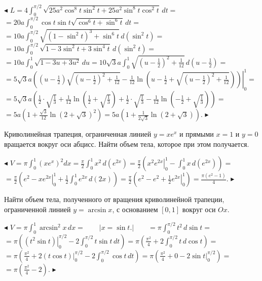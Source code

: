 \documentclass[a5paper,10pt]{article}
\begin{document}
\medskip
\noindent $\blacktriangleleft$
$\displaystyle L=4\int_0^{\pi/2}\sqrt{25a^2\cos^8t\sin^2t+25a^2\sin^8t\cos^2t}\,dt=$\\
$\displaystyle =20a\int_0^{\pi/2}\cos t\sin t\sqrt{\cos^6t+\sin^6t}\,dt=$\\
$\displaystyle =10a\int_0^{\pi/2}\sqrt{(1-\sin^2t)^3+\sin^6t}\,d(\sin^2 t)=$\\
$\displaystyle =10a\int_0^{\pi/2}\sqrt{1-3\sin^2t+3\sin^4t}\,d(\sin^2 t)=$\\
$\displaystyle =10a\int_0^1\sqrt{1-3u+3u^2}\,du=10\sqrt3a\int_0^1
\sqrt{\left(u-\frac12\right)^2+\frac{1}{12}}\,d\left(u-\frac12\right)=$\\
$\displaystyle =5\sqrt3a\left.\left(\left(u-\frac12\right)
\sqrt{\left(u-\frac12\right)^2+\frac{1}{12}}-
\frac{1}{12}\ln\left(u-\frac12+
\sqrt{\left(u-\frac12\right)^2+
\frac{1}{12}}\right)\right)\right|_0^1=$\\
$\displaystyle =5\sqrt3a\left(\frac12\cdot\sqrt{\frac13}+
\frac{1}{12}\ln\left(\frac12+\sqrt{\frac13}\right)+
\frac12\cdot\sqrt{\frac13}-
\frac{1}{12}\ln\left(-\frac12+\sqrt{\frac13}\right)\right)=$\\
$\displaystyle =5a\left(1+\frac{\sqrt3}{12}\ln(2+\sqrt3)^2\right)=
5a\left(1+\frac{1}{2\sqrt3}\ln(2+\sqrt3)\right)$.
$\blacktriangleright$

\medskip
{} Криволинейная трапеция, ограниченная линией $y=xe^x$
и прямыми $x=1$ и $y=0$ вращается вокруг оси абцисс. Найти объем тела,
которое при этом получается.

\medskip
\noindent $\blacktriangleleft$ $\displaystyle V=\pi\int_0^1(xe^x)^2dx=
\frac{\pi}{2}\int_0^1x^2\,d(e^{2x})=
\frac{\pi}{2}\left(\left.x^2e^{2x}\right|_0^1-
\int_0^1x\,d(e^{2x})\right)=$\\
$\displaystyle =\frac{\pi}{2}\left(e^2-\left.xe^{2x}\right|_0^1
+\frac12\int_0^1e^{2x}\,d(2x)\right)=
\frac{\pi}{2}\left(e^2-e^2+\frac12\left.e^{2x}\right|_0^1\right)=
\frac{\pi(e^2-1)}{4}$. $\blacktriangleright$

\medskip
{} Найти объем тела, полученного от вращения
криволинейной трапеции, ограниченной линией $y=\arcsin x$,
с основанием $[0,1]$ вокруг оси $Ox$.

\medskip
\noindent $\blacktriangleleft$ $\displaystyle V=\pi\int_0^1\arcsin^2x\,dx=
\qquad\left|x=\sin t.\right|\qquad
=\pi\int_0^{\pi/2}t^2\,d\sin t=$\\
$\displaystyle =\pi\left(\left.(t^2\sin t)\right|_0^{\pi/2}-2\int_0^{\pi/2}t\sin t\,dt\right)=
\pi\left(\frac{\pi^2}{4}+2\int_0^{\pi/2}t\,d\cos t\right)=$\\
$\displaystyle =\pi\left(\frac{\pi^2}{4}+2\left.(t\cos t)\right|_0^{\pi/2}-
2\int_0^{\pi/2}\cos t\,dt\right)=
\pi\left(\frac{\pi^2}{4}+0-
2\left.\sin t\right|_0^{\pi/2}\right)=$\\
$\displaystyle =\pi\left(\frac{\pi^2}{4}-2\right)$. $\blacktriangleright$
\end{document}
